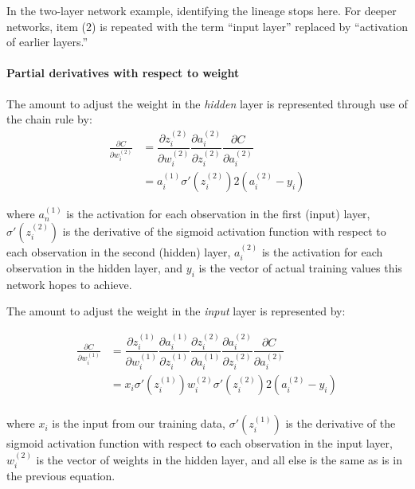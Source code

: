 In the two-layer network example, identifying the lineage stops here.  For deeper networks, item (2) is repeated with the term ``input layer'' replaced by ``activation of earlier layers.''



\hypertarget{partial-derivatives-with-respect-to-weight}{%
\paragraph{Partial derivatives with respect to
weight}\label{partial-derivatives-with-respect-to-weight}}

The amount to adjust the weight in the \emph{hidden} layer is
represented through use of the chain rule by:
\begin{align*}
\frac{\partial{C}}{\partial{w_i^{(2)}}}    &=  \dfrac{\partial{z_i^{(2)}}}{\partial{w_i^{(2)}}}
     \dfrac{\partial{a_i^{(2)}}}{\partial{z_i^{(2)}}}
     \dfrac{\partial{C}}{\partial{a_i^{(2)}}} \\ 
 &= a_i^{(1)} \sigma'(z_i^{(2)}) 2(a_i^{(2)}-y_i) \end{align*}

where \(a_n^{(1)}\) is the activation for each observation in the first
(input) layer, \(\sigma'(z_i^{(2)})\) is the derivative of the sigmoid
activation function with respect to each observation in the second
(hidden) layer, \(a_i^{(2)}\) is the activation for each observation in
the hidden layer, and \(y_i\) is the vector of actual training values
this network hopes to achieve.

The amount to adjust the weight in the \emph{input} layer is
represented by:

    \begin{align*}
\frac{\partial{C}}{\partial{w_i^{(1)}}}    &= \dfrac{\partial{z_i^{(1)}}}{\partial{w_i^{(1)}}} \dfrac{\partial{a_i^{(1)}}}{\partial{z_i^{(1)}}}  \dfrac{\partial{z_i^{(2)}}}{\partial{a_i^{(1)}}}
     \dfrac{\partial{a_i^{(2)}}}{\partial{z_i^{(2)}}}
     \dfrac{\partial{C}}{\partial{a_i^{(2)}}} \\    
&= x_i \sigma'(z_i^{(1)}) w_i^{(2)} \sigma'(z_i^{(2)}) 2(a_i^{(2)}-y_i) \\
     \end{align*}

where \(x_i\) is the input from our training data,
\(\sigma'(z_i^{(1)})\) is the derivative of the sigmoid activation
function with respect to each observation in the input layer,
\(w_i^{(2)}\) is the vector of weights in the hidden layer, and all else
is the same as is in the previous equation.

